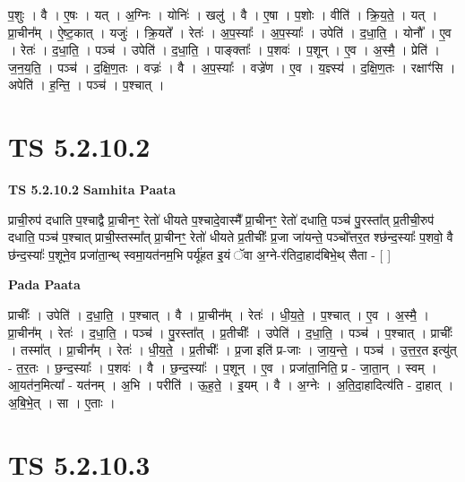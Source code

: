 \documentclass[17pt]{extarticle}
\begin{document}
प॒शुः । वै । ए॒षः । यत् । अ॒ग्निः । योनिः॑ । खलु॑ । वै । ए॒षा । प॒शोः । वीति॑ । क्रि॒य॒ते॒ । यत् । प्रा॒चीन᳚म् । ऐ॒ष्ट॒कात् । यजुः॑ । क्रि॒यते᳚ । रेतः॑ । अ॒प॒स्याः᳚ । अ॒प॒स्याः᳚ । उपेति॑ । द॒धा॒ति॒ । योनौ᳚ । ए॒व । रेतः॑ । द॒धा॒ति॒ । पञ्च॑ । उपेति॑ । द॒धा॒ति॒ । पाङ्क्ताः᳚ । प॒शवः॑ । प॒शून् । ए॒व । अ॒स्मै॒ । प्रेति॑ । ज॒न॒य॒ति॒ । पञ्च॑ । द॒क्षि॒ण॒तः । वज्रः॑ । वै । अ॒प॒स्याः᳚ । वज्रे॑ण । ए॒व । य॒ज्ञ्स्य॑ । द॒क्षि॒ण॒तः । रक्षाꣳ॑सि । अपेति॑ । ह॒न्ति॒ । पञ्च॑ । प॒श्चात् ।  \newline




\section*{ TS 5.2.10.2 }

\textbf{TS 5.2.10.2 } \newline
\textbf{Samhita Paata} \newline

प्राची॒रुप॑ दधाति प॒श्चाद्वै प्रा॒चीनꣳ॒॒ रेतो॑ धीयते प॒श्चादे॒वास्मै᳚ प्रा॒चीनꣳ॒॒ रेतो॑ दधाति॒ पञ्च॑ पु॒रस्ता᳚त् प्र॒तीची॒रुप॑ दधाति॒ पञ्च॑ प॒श्चात् प्राची॒स्तस्मा᳚त् प्रा॒चीनꣳ॒॒ रेतो॑ धीयते प्र॒तीचीः᳚ प्र॒जा जा॑यन्ते॒ पञ्चो᳚त्तर॒त श्छ॑न्द॒स्याः᳚ प॒शवो॒ वै छ॑न्द॒स्याः᳚ प॒शूने॒व प्रजा॑ता॒न्थ् स्वमा॒यत॑नम॒भि पर्यू॑हत इ॒यं ॅवा अ॒ग्ने-र॑तिदा॒हाद॑बिभे॒थ् सैता - [  ] \newline

\textbf{Pada Paata} \newline

प्राचीः᳚ । उपेति॑ । द॒धा॒ति॒ । प॒श्चात् । वै । प्रा॒चीन᳚म् । रेतः॑ । धी॒य॒ते॒ । प॒श्चात् । ए॒व । अ॒स्मै॒ । प्रा॒चीन᳚म् । रेतः॑ । द॒धा॒ति॒ । पञ्च॑ । पु॒रस्ता᳚त् । प्र॒तीचीः᳚ । उपेति॑ । द॒धा॒ति॒ । पञ्च॑ । प॒श्चात् । प्राचीः᳚ । तस्मा᳚त् । प्रा॒चीन᳚म् । रेतः॑ । धी॒य॒ते॒ । प्र॒तीचीः᳚ । प्र॒जा इति॑ प्र-जाः । जा॒य॒न्ते॒ । पञ्च॑ । उ॒त्त॒र॒त इत्यु॑त् - त॒र॒तः । छ॒न्द॒स्याः᳚ । प॒शवः॑ । वै । छ॒न्द॒स्याः᳚ । प॒शून् । ए॒व । प्रजा॑ता॒निति॒ प्र - जा॒ता॒न् । स्वम् । आ॒यत॑न॒मित्या᳚ - यत॑नम् । अ॒भि । परीति॑ । ऊ॒ह॒ते॒ । इ॒यम् । वै । अ॒ग्नेः । अ॒ति॒दा॒हादित्य॑ति - दा॒हात् । अ॒बि॒भे॒त् । सा । ए॒ताः ।  \newline




\section*{ TS 5.2.10.3 }
\end{document}
